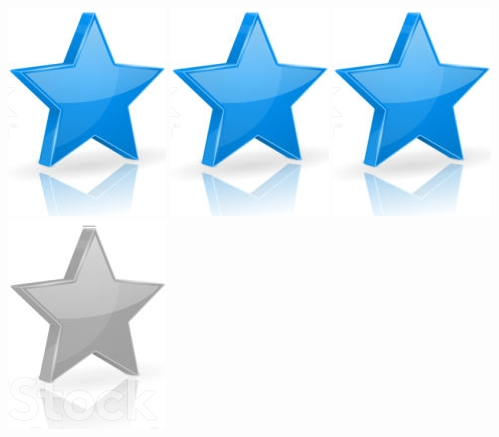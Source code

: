 \documentclass[10pt,a4paper,sans]{article}
\begin{document}
\begin{minipage}[t]{0.26\textwidth}
\begin{mdframed}[style=cadreCompetences]
\begin{itemize}
{                    \includegraphics[scale=0.20]{img/star.png} \hspace{-0.2cm}
                    \includegraphics[scale=0.20]{img/star.png} \hspace{-0.2cm}
                    \includegraphics[scale=0.20]{img/star.png} \hspace{-0.2cm}
                    \includegraphics[scale=0.20]{img/empty_star.png}}

\end{itemize}
\end{mdframed}
\end{minipage}
\end{document}

